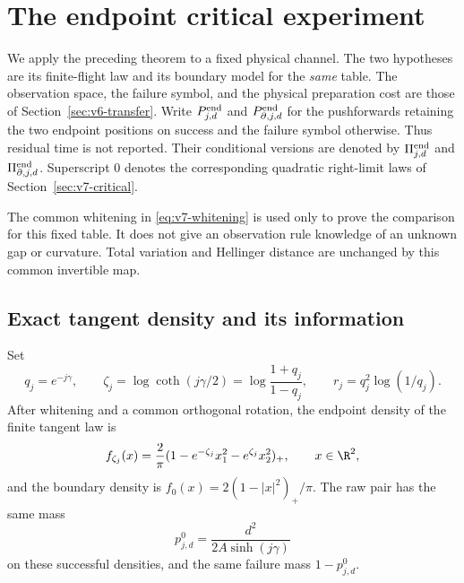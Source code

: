 \section{The endpoint critical experiment}
\label{sec:v17-endpoint-critical}
We apply the preceding theorem to a fixed physical channel. The two
hypotheses are its finite-flight law and its boundary model for the
\emph{same} table. The observation space, the failure symbol, and the
physical preparation cost are those of Section~\ref{sec:v6-transfer}.
Write $P^{\rm end}_{j,d}$ and $P^{\rm end}_{\partial,j,d}$ for the
pushforwards retaining the two endpoint positions on success and the
failure symbol otherwise. Thus residual time is not reported. Their
conditional versions are denoted by $\Pi^{\rm end}_{j,d}$ and
$\Pi^{\rm end}_{\partial,j,d}$. Superscript $0$ denotes the corresponding
quadratic right-limit laws of Section~\ref{sec:v7-critical}.

The common whitening in \eqref{eq:v7-whitening} is used only to prove
the comparison for this fixed table. It does not give an observation
rule knowledge of an unknown gap or curvature. Total variation and
Hellinger distance are unchanged by this common invertible map.

\subsection{Exact tangent density and its information}
Set
\begin{equation}\label{eq:v17-q-rates}
 q_j=e^{-j\gamma},\qquad
 \zeta_j=\log\coth(j\gamma/2)
        =\log\frac{1+q_j}{1-q_j},\qquad
                r_j=q_j^2\log(1/q_j).
\end{equation}
After whitening and a common orthogonal rotation, the endpoint density
of the finite tangent law is
\begin{equation}\label{eq:v17-cap-density}
 f_{\zeta_j}(x)=\frac2\pi
       (1-e^{-\zeta_j}x_1^2-e^{\zeta_j}x_2^2)_+,
             \qquad x\in\R^2,
\end{equation}
and the boundary density is $f_0(x)=2(1-|x|^2)_+/\pi$.
The raw pair has the same mass
\begin{equation}\label{eq:v17-common-mass}
                       p_{j,d}^0=\frac{d^2}{2A\sinh(j\gamma)}
\end{equation}
on these successful densities, and the same failure mass $1-p_{j,d}^0$.

